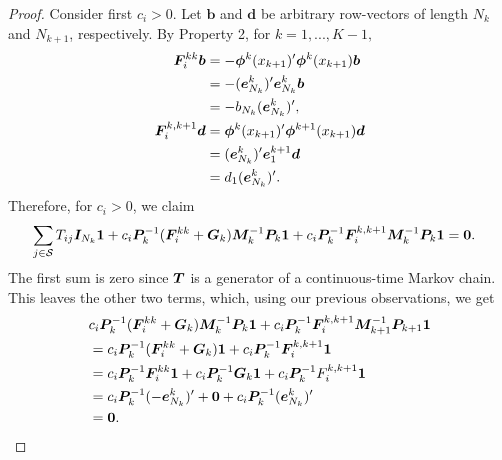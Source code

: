 \begin{proof}
	Consider first \(c_i>0\). Let \(\boldsymbol b\) and \(\boldsymbol d\) be arbitrary row-vectors of length \(N_k\) and \(N_{k+1}\), respectively. By Property 2, for \(k=1,...,K-1,\)
	\begin{align*}
        \boldsymbol F_i^{kk}\boldsymbol b &= -\boldsymbol \phi^k(x_{k+1})'{} \boldsymbol \phi^k(x_{k+1})\boldsymbol b \\&= -(\boldsymbol e^k_{N_k})'{} \boldsymbol e_{N_k}^k\boldsymbol b \\&= -b_{N_k}(\boldsymbol e_{N_k}^k)'{},
        \\\boldsymbol F_i^{k,k+1}\boldsymbol d &= \boldsymbol \phi^{k}(x_{k+1})'{} \boldsymbol \phi^{k+1}(x_{k+1})\boldsymbol d \\&= (\boldsymbol e^{k}_{N_k})'{} \boldsymbol e_{1}^{k+1}\boldsymbol d \\&= d_{1}(\boldsymbol e_{N_{k}}^{k})'{}.
	\end{align*}
	Therefore, for \(c_i>0\), we claim
	\begin{align*}
		&\sum_{j\in\mathcal{S}}T_{ij}\boldsymbol I_{N_k}\boldsymbol 1 + c_i \boldsymbol P_k^{-1}(\boldsymbol F_i^{kk}+\boldsymbol G_k)\boldsymbol M_k^{-1}\boldsymbol P_k\boldsymbol 1 + c_i \boldsymbol P_k^{-1}\boldsymbol F_i^{k,k+1}\boldsymbol M_k^{-1}\boldsymbol P_k\boldsymbol 1 = \boldsymbol 0.
	\end{align*}
	The first sum is zero since \(\boldsymbol T\) is a generator of a continuous-time Markov chain. This leaves the other two terms, which, using our previous observations, we get 
	\begin{align*}
		& c_i \boldsymbol P_k^{-1}(\boldsymbol F_i^{kk}+\boldsymbol G_k)\boldsymbol M_k^{-1}\boldsymbol P_k\boldsymbol 1 + c_i \boldsymbol P_k^{-1}\boldsymbol F_i^{k,k+1}\boldsymbol M_{k+1}^{-1}\boldsymbol P_{k+1}\boldsymbol 1
		\\&= c_i \boldsymbol P_k^{-1}(\boldsymbol F_i^{kk}+\boldsymbol G_k)\boldsymbol 1 + c_i \boldsymbol P_k^{-1}\boldsymbol F_i^{k,k+1}\boldsymbol 1
		\\&= c_i \boldsymbol P_k^{-1}\boldsymbol F_i^{kk}\boldsymbol 1 + c_i \boldsymbol P_k^{-1}\boldsymbol G_k\boldsymbol 1 +  c_i \boldsymbol P_k^{-1}F_i^{k,k+1}\boldsymbol 1
		\\&= c_i \boldsymbol P_k^{-1}(-\boldsymbol e_{N_k}^k)'{} + \boldsymbol 0 + c_i \boldsymbol P_k^{-1}(\boldsymbol e_{N_k}^k)'{}
		\\&= \boldsymbol 0.
	\end{align*}
	

\end{proof}
